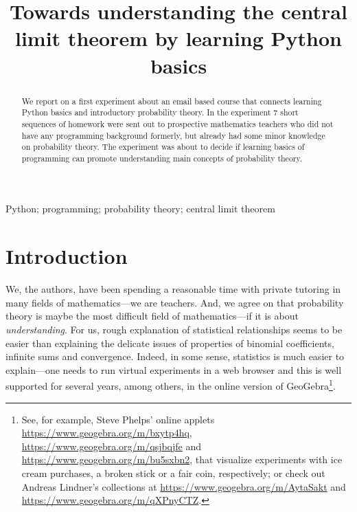 \documentclass[]{interact}
\theoremstyle{plain}%
\theoremstyle{definition}
\theoremstyle{remark}
\begin{document}

\title{Towards understanding the central limit theorem by learning Python basics}

\author{
}

\maketitle

\begin{abstract}

We report on a first experiment about an email based course that connects learning
Python basics and introductory probability theory. In the experiment 7 short sequences
of homework were sent out to prospective mathematics teachers who did not have
any programming background formerly, but already had some minor knowledge on probability theory.
The experiment was about to decide if learning basics of programming can promote
understanding main concepts of probability theory.
\end{abstract}

\begin{keywords}
Python; programming; probability theory; central limit theorem
\end{keywords}

\section{Introduction}

We, the authors, have been spending a reasonable time with private tutoring in many fields
of mathematics---we are teachers. And, we agree on that probability theory is maybe
the most difficult field of mathematics---if it is about \textit{understanding}. For us, rough explanation
of statistical relationships seems to be easier than explaining the delicate issues
of properties of binomial coefficients, infinite sums and convergence. Indeed, in some
sense, statistics is much easier to explain---one needs to run virtual experiments
in a web browser
and this is well supported for several years, among others, in the online version of GeoGebra\footnote{%
See, for example, Steve Phelps' online applets
\url{https://www.geogebra.org/m/bxytp4hq},
\url{https://www.geogebra.org/m/qsjbqjfe} and
\url{https://www.geogebra.org/m/bu5sxbn2},
that visualize experiments with ice cream purchases, a broken stick or a fair coin, respectively;
or check out Andreas Lindner's collections at \url{https://www.geogebra.org/m/AytaSakt}
and \url{https://www.geogebra.org/m/qXPnyCTZ}.}.
\end{document}
